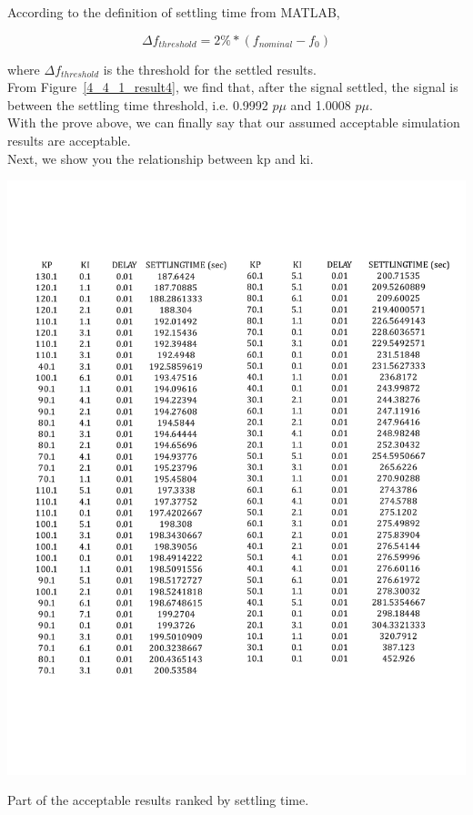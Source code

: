 According to the definition of settling time from MATLAB,

\begin{equation}
    \Delta f_{threshold} = 2\% * (f_{nominal} - f_0)
\end{equation}

where $\Delta f_{threshold}$ is the threshold for the settled results.\\

From Figure~\ref{4_4_1_result4}, we find that, after the signal settled, the signal is between the settling time threshold, i.e. 0.9992 $p\mu$ and 1.0008 $p\mu$.\\


With the prove above, we can finally say that our assumed acceptable simulation results are acceptable.\\

Next, we show you the relationship between kp and ki. \\

\begin{table}[htbp]
\centering
\includegraphics[width = \textwidth]{figure/4_4_1_table.pdf}
\caption{Part of the acceptable results ranked by settling time.}
\label{4_4_1_table}
\end{table}

